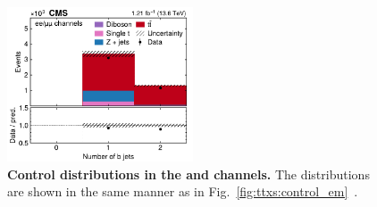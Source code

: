 \begin{figure}[!hp]
\hfill
\includegraphics[width=0.49\textwidth]{figures/ttxs/nbtag_eemm.pdf}
\caption{
    \textbf{Control distributions in the \ee and \mumu channels.} The distributions are shown in the same manner as in Fig.~\ref{fig:ttxs:control_em}~\cite{CMS:TOP-22-012}.
}
\label{fig:ttxs:control_eemm}
\end{figure}

